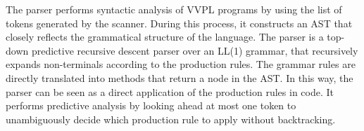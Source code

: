









The parser performs syntactic analysis of VVPL programs by using the list of tokens generated by the scanner.
During this process, it constructs an AST that closely reflects the grammatical structure of the language.
The parser is a top-down predictive recursive descent parser over an LL(1) grammar, that recursively expands non-terminals according
to the production rules. The grammar rules are directly translated into methods that return a node in the AST.
In this way, the parser can be seen as a direct application of the production rules in code.
It performs predictive analysis by looking ahead at most one token to unambiguously decide which 
production rule to apply without backtracking. 

